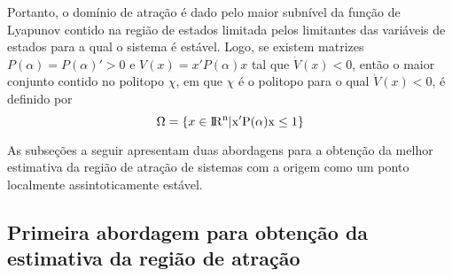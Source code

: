 Portanto, o domínio de atração é dado pelo maior subnível da função de Lyapunov contido na região de estados limitada pelos limitantes das variáveis de estados para a qual o sistema é estável. Logo, se existem matrizes $P(\alpha) = P(\alpha)' > 0$ e $V(x) = x'P(\alpha)x$ tal que $\dot{V}(x) < 0$, então o maior conjunto contido no politopo $\chi$, em que $\chi$ é o politopo para o qual $\dot{V}(x) < 0$, é definido por
\begin{equation} \label{eq:Omega}
\Omega = \{x \in \rm I\!R^{n} | x'P(\alpha)x \leq 1\}
\end{equation}

As subseções a seguir apresentam duas abordagens para a obtenção da melhor estimativa da região de atração de sistemas com a origem como um ponto localmente assintoticamente estável.

\subsection{Primeira abordagem para obtenção da estimativa da região de atração}

